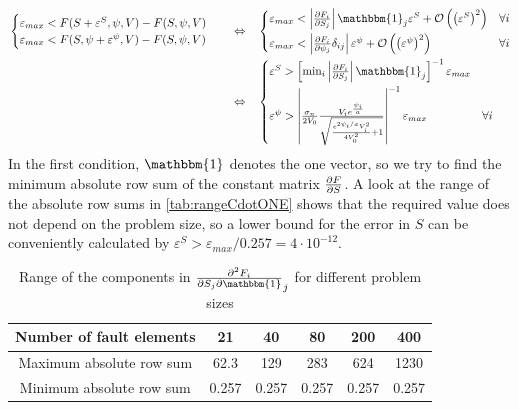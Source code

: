 \begin{align}
&\begin{cases}
	\varepsilon_{max} < F(S+\varepsilon^{S},\psi,V) - F(S,\psi,V) \\
	\varepsilon_{max} < F(S,\psi+\varepsilon^{\psi},V) - F(S,\psi,V) 
\end{cases} &&
\Leftrightarrow&
&\begin{cases}
		\varepsilon_{max} < \left|\pdv{F_i}{S_j}\right|\mathbbm{1}_j \varepsilon^S + \mathcal{O}\left(\left(\varepsilon^S\right)^2\right) & \forall i \\[0.2cm]
		\varepsilon_{max} < \left|\pdv{F_i}{\psi_j}\delta_{ij}\right|\varepsilon^\psi + \mathcal{O}\left(\left(\varepsilon^\psi\right)^2\right) & \forall i 
\end{cases} \nonumber \\
&&&\Leftrightarrow &
&\begin{cases}
	\varepsilon^S > \left[\min_i\left|\pdv{F_i}{S_j}\right|\mathbbm{1}_j\right]^{-1}\varepsilon_{max}  \\[0.2cm]
	\varepsilon^\psi > \left|\frac{\sigma_n}{2V_0}\frac{V_i e^{\frac{\psi_i}{a}}}{\sqrt{\frac{e^{2\psi_i/a}V_i^2}{4V_0^2} + 1}} \right|^{-1}\varepsilon_{max} & \forall i
\end{cases}
\end{align}
In the first condition, $\mathbbm{1}$ denotes the one vector, so we try to find the minimum absolute row sum of the constant matrix $\pdv{F}{S}$. A look at the range of the absolute row sums in \autoref{tab:rangeCdotONE} shows that the required value does not depend on the problem size, so a lower bound for the error in $S$ can be conveniently calculated by $\varepsilon^S > \varepsilon_{max}/0.257=4\cdot10^{-12}$.
\begin{table}[H]
	\centering 
	\begin{tabular}{ | c | c c c c c |}
		\hline	
		Number of fault elements	& 21 	& 40 	& 80 	& 200 	& 400 	\\ \hline
		Maximum absolute row sum    & 62.3	& 129	& 283	& 624 	& 1230	\\  
		Minimum absolute row sum  	& 0.257	& 0.257 & 0.257	& 0.257 & 0.257 \\
		\hline
	\end{tabular}
	\caption{Range of the components in $\pdv{F_i}{S_j}\mathbbm{1}_j$ for different problem sizes} 
	\label{tab:rangeCdotONE}
\end{table}

